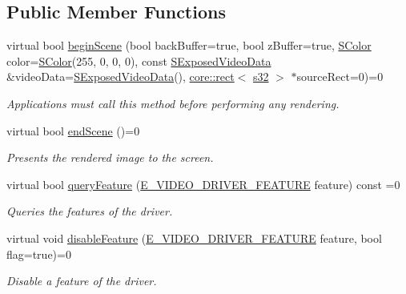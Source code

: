 \subsection*{Public Member Functions}
\begin{DoxyCompactItemize}
\item 
virtual bool \hyperlink{classirr_1_1video_1_1IVideoDriver_a015b8f2f18c260a00a858181be1e9945}{begin\+Scene} (bool back\+Buffer=true, bool z\+Buffer=true, \hyperlink{classirr_1_1video_1_1SColor}{S\+Color} color=\hyperlink{classirr_1_1video_1_1SColor}{S\+Color}(255, 0, 0, 0), const \hyperlink{structirr_1_1video_1_1SExposedVideoData}{S\+Exposed\+Video\+Data} \&video\+Data=\hyperlink{structirr_1_1video_1_1SExposedVideoData}{S\+Exposed\+Video\+Data}(), \hyperlink{classirr_1_1core_1_1rect}{core\+::rect}$<$ \hyperlink{namespaceirr_ac66849b7a6ed16e30ebede579f9b47c6}{s32} $>$ $\ast$source\+Rect=0)=0
\begin{DoxyCompactList}\small\item\em Applications must call this method before performing any rendering. \end{DoxyCompactList}\item 
virtual bool \hyperlink{classirr_1_1video_1_1IVideoDriver_a75f61a93c5fc9fdf161c044d27bc994e}{end\+Scene} ()=0
\begin{DoxyCompactList}\small\item\em Presents the rendered image to the screen. \end{DoxyCompactList}\item 
virtual bool \hyperlink{classirr_1_1video_1_1IVideoDriver_adde468368b77441ada246e1603da4f47}{query\+Feature} (\hyperlink{namespaceirr_1_1video_a57b1721e42a79c5dcf8e830e3621e08f}{E\+\_\+\+V\+I\+D\+E\+O\+\_\+\+D\+R\+I\+V\+E\+R\+\_\+\+F\+E\+A\+T\+U\+RE} feature) const =0
\begin{DoxyCompactList}\small\item\em Queries the features of the driver. \end{DoxyCompactList}\item 
virtual void \hyperlink{classirr_1_1video_1_1IVideoDriver_aea64c03fc205f23ec7575884fb7309c8}{disable\+Feature} (\hyperlink{namespaceirr_1_1video_a57b1721e42a79c5dcf8e830e3621e08f}{E\+\_\+\+V\+I\+D\+E\+O\+\_\+\+D\+R\+I\+V\+E\+R\+\_\+\+F\+E\+A\+T\+U\+RE} feature, bool flag=true)=0
\begin{DoxyCompactList}\small\item\em Disable a feature of the driver. \end{DoxyCompactList}\item 

\end{DoxyCompactItemize}
